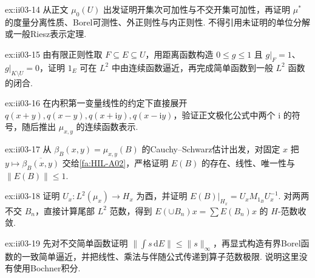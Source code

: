 \begin{FAExercise}[RMK外测度与正则性]{ex:ii03-14}
从正文 \(\displaystyle\mu_0(U)\) 出发证明开集次可加性与不交开集可加性，再证明 \(\displaystyle\mu^*\) 的度量分离性质、Borel可测性、外正则性与内正则性. 不得引用未证明的单位分解或一般Riesz表示定理.
\end{FAExercise}

\begin{FAExercise}{ex:ii03-15}
由有限正则性取 \(\displaystyle F\subseteq E\subseteq U\)，用距离函数构造 \(\displaystyle0\leqslant g\leqslant1\) 且 \(\displaystyle g|_F=1\)、\(\displaystyle g|_{K\setminus U}=0\)，证明 \(\displaystyle1_E\) 可在 \(\displaystyle L^2\) 中由连续函数逼近，再完成简单函数到一般 \(\displaystyle L^2\) 函数的闭合.
\end{FAExercise}

\begin{FAExercise}[第一变量线性的极化符号]{ex:ii03-16}
在内积第一变量线性的约定下直接展开 \(\displaystyle q(x+y),q(x-y),q(x+\mathrm{i}y),q(x-\mathrm{i}y)\)，验证正文极化公式中两个 \(\displaystyle\mathrm{i}\) 的符号，随后推出 \(\displaystyle\mu_{x,y}\) 的连续函数表示.
\end{FAExercise}

\begin{FAExercise}[由Riesz表示定理重建谱投影]{ex:ii03-17}
从 \(\displaystyle\beta_B(x,y)=\mu_{x,y}(B)\) 的Cauchy--Schwarz估计出发，对固定 \(\displaystyle x\) 把 \(\displaystyle y\mapsto\overline{\beta_B(x,y)}\) 交给\autoref{fa:HIL-A02}，严格证明 \(\displaystyle E(B)\) 的存在、线性、唯一性与 \(\displaystyle\|E(B)\|\leqslant1\).
\end{FAExercise}

\begin{FAExercise}[循环模型与投影值测度的强可数可加性]{ex:ii03-18}
证明 \(\displaystyle U_x:L^2(\mu_x)\to H_x\) 为酉，并证明 \(\displaystyle E(B)|_{H_x}=U_xM_{1_B}U_x^{-1}\). 对两两不交 \(\displaystyle B_n\)，直接计算尾部 \(\displaystyle L^2\) 范数，得到 \(\displaystyle E(\cup B_n)x=\sum E(B_n)x\) 的 \(\displaystyle H\)-范数收敛.
\end{FAExercise}

\begin{FAExercise}[有界Borel谱积分]{ex:ii03-19}
先对不交简单函数证明 \(\displaystyle\|\int s\,\mathrm{d}E\|\leqslant\|s\|_\infty\)，再显式构造有界Borel函数的一致简单逼近，并把线性、乘法与伴随公式传递到算子范数极限. 说明这里没有使用Bochner积分.
\end{FAExercise}

